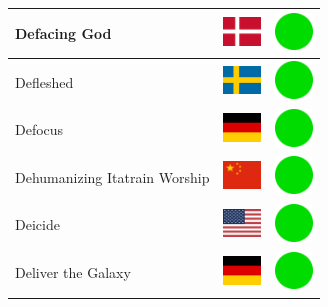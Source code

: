\documentclass[12pt, a4paper, twoside]{report}
\begin{document}
\begin{center}
\begin{longtable}{|p{5cm}|p{2cm}|p{2cm}|}
 Defacing God                                               & \includegraphics[width=1cm]{../4x3/dk} &   \includegraphics[width=1cm]{../likes/y} \\ \hline
 Defleshed                                                  & \includegraphics[width=1cm]{../4x3/se} &   \includegraphics[width=1cm]{../likes/y} \\ \hline
 Defocus                                                    & \includegraphics[width=1cm]{../4x3/de} &   \includegraphics[width=1cm]{../likes/y} \\ \hline
 Dehumanizing Itatrain Worship                              & \includegraphics[width=1cm]{../4x3/cn} &   \includegraphics[width=1cm]{../likes/y} \\ \hline
 Deicide                                                    & \includegraphics[width=1cm]{../4x3/us} &   \includegraphics[width=1cm]{../likes/y} \\ \hline
 Deliver the Galaxy                                         & \includegraphics[width=1cm]{../4x3/de} &   \includegraphics[width=1cm]{../likes/y} \\ \hline

\end{longtable}
\end{center}
\end{document}
